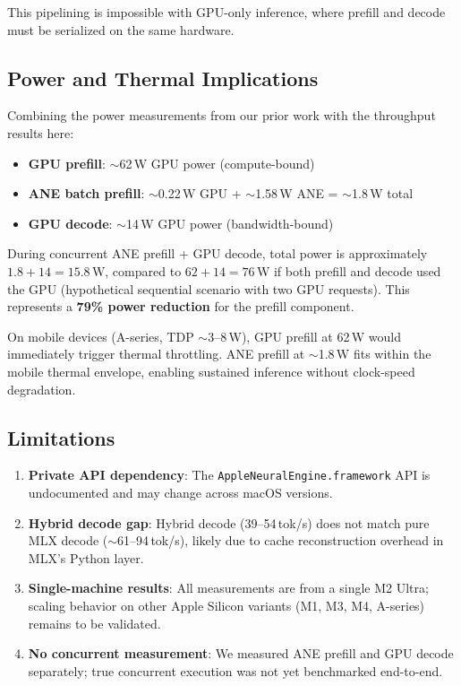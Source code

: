 \documentclass[11pt]{article}
\begin{document}
This pipelining is impossible with GPU-only inference, where prefill and
decode must be serialized on the same hardware.

\subsection{Power and Thermal Implications}

Combining the power measurements from our prior work with the throughput
results here:

\begin{itemize}[nosep]
  \item \textbf{GPU prefill}: $\sim$62\,W GPU power (compute-bound)
  \item \textbf{ANE batch prefill}: $\sim$0.22\,W GPU + $\sim$1.58\,W ANE
        = $\sim$1.8\,W total
  \item \textbf{GPU decode}: $\sim$14\,W GPU power (bandwidth-bound)
\end{itemize}

During concurrent ANE prefill + GPU decode, total power is approximately
$1.8 + 14 = 15.8$\,W, compared to $62 + 14 = 76$\,W if both prefill and
decode used the GPU (hypothetical sequential scenario with two GPU
requests). This represents a \textbf{79\% power reduction} for the
prefill component.

On mobile devices (A-series, TDP $\sim$3--8\,W), GPU prefill at 62\,W
would immediately trigger thermal throttling. ANE prefill at $\sim$1.8\,W
fits within the mobile thermal envelope, enabling sustained inference
without clock-speed degradation.

\subsection{Limitations}

\begin{enumerate}[nosep]
  \item \textbf{Private API dependency}: The
        \texttt{AppleNeuralEngine.framework} API is undocumented and may
        change across macOS versions.
  \item \textbf{Hybrid decode gap}: Hybrid decode (39--54\,tok/s) does not
        match pure MLX decode ($\sim$61--94\,tok/s), likely due to cache
        reconstruction overhead in MLX's Python layer.
  \item \textbf{Single-machine results}: All measurements are from a
        single M2 Ultra; scaling behavior on other Apple Silicon variants
        (M1, M3, M4, A-series) remains to be validated.
  \item \textbf{No concurrent measurement}: We measured ANE prefill and
        GPU decode separately; true concurrent execution was not yet
        benchmarked end-to-end.
\end{enumerate}
\end{document}
